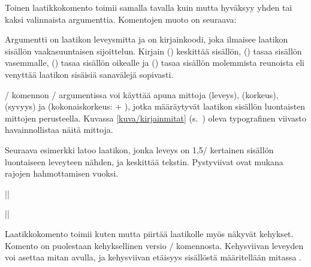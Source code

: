 Toinen laatikkokomento  toimii samalla tavalla kuin
 mutta hyväksyy yhden tai kaksi valinnaista argumenttia.
Komentojen muoto on seuraava:

\begin{koodilohkosis}
\end{koodilohkosis}

\noindent
Argumentti  on laatikon leveysmitta ja  on
kirjainkoodi, joka ilmaisee laatikon sisällön vaakasuuntaisen
sijoittelun. Kirjain  () keskittää sisällön,
 () tasaa sisällön vasemmalle, 
() tasaa sisällön oikealle ja 
() tasaa sisällön molemmista reunoista eli venyttää
laatikon sisäisiä sanavälejä sopivasti.

\begin{koodilohkosis}
\end{koodilohkosis}

\begin{tulossis}
\end{tulossis}

\noindent
{}\-/ komennon \-/ argumentissa voi käyttää
apuna mittoja  (leveys),  (korkeus),
 (syvyys) ja  (kokonaiskorkeus:
 + ), jotka määräytyvät laatikon sisällön
luontaisten mittojen perusteella. Kuvassa \ref{kuva/kirjainmitat}
(s.~\pageref{kuva/kirjainmitat}) oleva typografinen viivasto
havainnollistaa näitä mittoja.

Seuraava esimerkki latoo laatikon, jonka leveys on 1,5\-/ kertainen
sisällön luontaiseen leveyteen nähden, ja keskittää tekstin. Pystyviivat
ovat mukana rajojen hahmottamisen vuoksi.

\begin{koodilohkosis}
||
\end{koodilohkosis}

\begin{tulossis}
  ||
\end{tulossis}

\noindent
Laatikkokomento  toimii kuten  mutta piirtää
laatikolle myös näkyvät kehykset. Komento  on
puolestaan kehyksellinen versio \-/ komennosta.
Kehysviivan leveyden voi asettaa mitan  avulla, ja
kehysviivan etäisyys sisällöstä määritellään mitassa .

